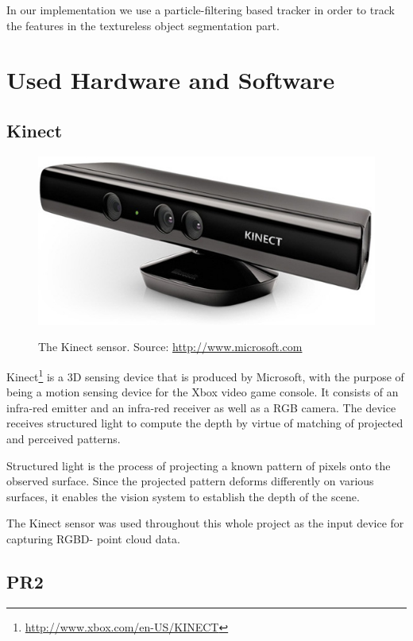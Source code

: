In our implementation we use a particle-filtering based tracker in order to track the features in the textureless object segmentation part.      



\section{Used Hardware and Software}
\subsection{Kinect}

\begin{figure}
\centering

{\includegraphics[width=0.5\columnwidth]{figures/kinect.jpg}}

\caption{The Kinect sensor. Source: \url{http://www.microsoft.com}}
\label{fig:kinect}
\end{figure}

Kinect\footnote{\url{http://www.xbox.com/en-US/KINECT}} is a 3D sensing device that is produced by Microsoft, with the purpose of being a motion sensing device for the Xbox video game console. It consists of an infra-red emitter and an infra-red receiver as well as a RGB camera. The device receives structured light to compute the depth by virtue of matching of projected and perceived patterns.

Structured light is the process of projecting a known pattern of pixels onto the observed surface. Since the projected pattern deforms differently on various surfaces, it enables  the vision system to establish the depth of the scene.

The Kinect sensor was used throughout this whole project as the input device for capturing RGBD- point cloud  data.

\subsection{PR2}

